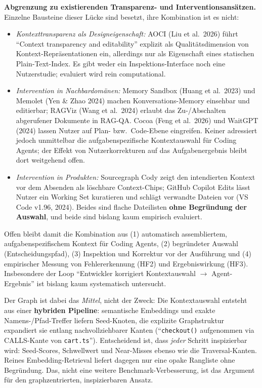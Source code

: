 \documentclass[12pt,a4paper]{scrartcl}
\newcommand{\code}[1]{\texttt{#1}}
\begin{document}
\noindent\textbf{Abgrenzung zu existierenden Transparenz- und Interventionsansätzen.} Einzelne
Bausteine dieser Lücke sind besetzt, ihre Kombination ist es nicht:

\begin{itemize}
  \item \emph{Kontexttransparenz als Designeigenschaft:} AOCI (Liu et al.\ 2026) führt
    \enquote{Context transparency and editability} explizit als Qualitätsdimension von
    Kontext-Repräsentationen ein, allerdings nur als Eigenschaft eines statischen
    Plain-Text-Index. Es gibt weder ein Inspektions-Interface noch eine Nutzerstudie;
    evaluiert wird rein computational.
  \item \emph{Intervention in Nachbardomänen:} Memory Sandbox (Huang et al.\ 2023) und Memolet
    (Yen \& Zhao 2024) machen Konversations-Memory einsehbar und editierbar; RAGViz
    (Wang et al.\ 2024) erlaubt das Zu-/Abschalten abgerufener Dokumente in RAG-QA. Cocoa
    (Feng et al.\ 2026) und WaitGPT (2024) lassen Nutzer auf Plan- bzw.\ Code-Ebene eingreifen.
    Keiner adressiert jedoch unmittelbar die aufgabenspezifische Kontextauswahl für Coding
    Agents; der Effekt von Nutzerkorrekturen auf das Aufgabenergebnis bleibt dort weitgehend
    offen.
  \item \emph{Intervention in Produkten:} Sourcegraph Cody zeigt den intendierten Kontext vor
    dem Absenden als löschbare Context-Chips; GitHub Copilot Edits lässt Nutzer ein Working Set
    kuratieren und schlägt verwandte Dateien vor (VS Code v1.96, 2024). Beides sind flache
    Dateilisten \textbf{ohne Begründung der Auswahl}, und beide sind bislang kaum empirisch
    evaluiert.
\end{itemize}

Offen bleibt damit die Kombination aus (1) automatisch assembliertem, aufgabenspezifischem
Kontext für Coding Agents, (2) begründeter Auswahl (Entscheidungspfad), (3) Inspektion und
Korrektur vor der Ausführung und (4) empirischer Messung von Fehlererkennung (HF2) und
Ergebniswirkung (HF3). Insbesondere der Loop \enquote{Entwickler korrigiert Kontextauswahl
$\rightarrow$ Agent-Ergebnis} ist bislang kaum systematisch untersucht.

Der Graph ist dabei das \emph{Mittel}, nicht der Zweck: Die Kontextauswahl entsteht aus einer
\textbf{hybriden Pipeline}: semantische Embeddings und exakte Namens-/Pfad-Treffer liefern
Seed-Knoten, die explizite Graphstruktur expandiert sie entlang nachvollziehbarer Kanten
(\enquote{\code{checkout()} aufgenommen via CALLS-Kante von \code{cart.ts}}). Entscheidend ist,
dass \emph{jeder} Schritt inspizierbar wird: Seed-Scores, Schwellwert und Near-Misses ebenso
wie die Traversal-Kanten. Reines Embedding-Retrieval liefert dagegen nur eine opake Rangliste
ohne Begründung. Das, nicht eine weitere Benchmark-Verbesserung, ist das Argument für den
graphzentrierten, inspizierbaren Ansatz.
\end{document}
